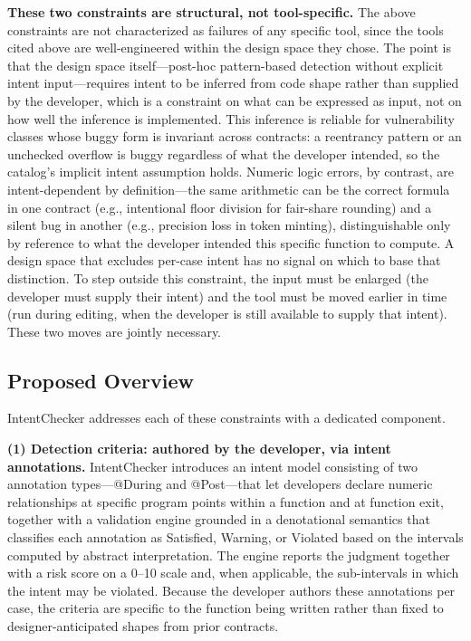\documentclass[pdflatex,sn-basic]{sn-jnl}%
\theoremstyle{thmstyleone}%
\theoremstyle{thmstyletwo}%
\theoremstyle{thmstylethree}%
\begin{document}
\smallskip
\noindent\textbf{These two constraints are structural, not tool-specific.}
The above constraints are not characterized as failures of any specific tool, since the tools cited above are well-engineered within the design space they chose.
The point is that the design space itself---post-hoc pattern-based detection without explicit intent input---requires intent to be inferred from code shape rather than supplied by the developer, which is a constraint on what can be expressed as input, not on how well the inference is implemented.
This inference is reliable for vulnerability classes whose buggy form is invariant across contracts: a reentrancy pattern or an unchecked overflow is buggy regardless of what the developer intended, so the catalog's implicit intent assumption holds.
Numeric logic errors, by contrast, are intent-dependent by definition---the same arithmetic can be the correct formula in one contract (e.g., intentional floor division for fair-share rounding) and a silent bug in another (e.g., precision loss in token minting), distinguishable only by reference to what the developer intended this specific function to compute.
A design space that excludes per-case intent has no signal on which to base that distinction.
To step outside this constraint, the input must be enlarged (the developer must supply their intent) and the tool must be moved earlier in time (run during editing, when the developer is still available to supply that intent). These two moves are jointly necessary.

\subsection{Proposed Overview}\label{sec:proposed-overview}

IntentChecker addresses each of these constraints with a dedicated component.

\smallskip
\noindent\textbf{(1) Detection criteria: authored by the developer, via intent annotations.}
IntentChecker introduces an intent model consisting of two annotation types---@During and @Post---that let developers declare numeric relationships at specific program points within a function and at function exit, together with a validation engine grounded in a denotational semantics that classifies each annotation as Satisfied, Warning, or Violated based on the intervals computed by abstract interpretation.
The engine reports the judgment together with a risk score on a 0--10 scale and, when applicable, the sub-intervals in which the intent may be violated.
Because the developer authors these annotations per case, the criteria are specific to the function being written rather than fixed to designer-anticipated shapes from prior contracts.
\end{document}
